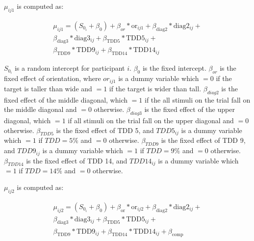 $\mu_{ij1}$ is computed as:

\begin{equation}
    \begin{aligned}
        \mu_{ij1}=(S_{0_i} + \beta_{0}) + \beta_{or}*\mathrm{or}_{ij1} + \beta_{\mathrm{diag}2}*\mathrm{diag}2_{ij}+ \\
        \beta_{\mathrm{diag}3}*\mathrm{diag}3_{ij} + \beta_{\mathrm{TDD}5}*\mathrm{TDD}5_{ij} +\\ \beta_{\mathrm{TDD}9}*\mathrm{TDD}9_{ij} + \beta_{\mathrm{TDD}14}*\mathrm{TDD}14_{ij}
        \label{circle_mu_eqn1}
    \end{aligned}
\end{equation}

$S_{0_i}$ is a random intercept for participant $i$. $\beta_{0}$ is the fixed intercept. $\beta_{or}$ is the fixed effect of orientation, where $or_{ij1}$ is a dummy variable which $=0$ if the target is taller than wide and $=1$ if the target is wider than tall. $\beta_{diag2}$ is the fixed effect of the middle diagonal, which $=1$ if the all stimuli on the trial fall on the middle diagonal and $=0$ otherwise. $\beta_{diag3}$ is the fixed effect of the upper diagonal, which $=1$ if all stimuli on the trial fall on the upper diagonal and $=0$ otherwise. $\beta_{TDD5}$ is the fixed effect of TDD 5, and $TDD5_{ij}$ is a dummy variable which $=1$ if $TDD=5\%$ and $=0$ otherwise. $\beta_{TDD9}$ is the fixed effect of TDD 9, and $TDD9_{ij}$ is a dummy variable which $=1$ if $TDD=9\%$ and $=0$ otherwise. $\beta_{TDD14}$ is the fixed effect of TDD 14, and $TDD14_{ij}$ is a dummy variable which $=1$ if $TDD=14\%$ and $=0$ otherwise. 

$\mu_{ij2}$ is computed as:

\begin{equation}
    \begin{aligned}
        \mu_{ij2}=(S_{0_i} + \beta_{0}) + \beta_{\mathrm{or}}*\mathrm{or}_{ij2} + \beta_{\mathrm{diag}2}*\mathrm{diag}2_{ij}+ \\\beta_{\mathrm{diag}3}*\mathrm{diag}3_{ij} + \beta_{\mathrm{TDD}5}*\mathrm{TDD}5_{ij} + \\\beta_{\mathrm{TDD}9}*\mathrm{TDD}9_{ij} + \beta_{\mathrm{TDD}14}*\mathrm{TDD}14_{ij} + \beta_{\mathrm{comp}}
        \label{circle_mu_eqn2}
    \end{aligned}
\end{equation}

